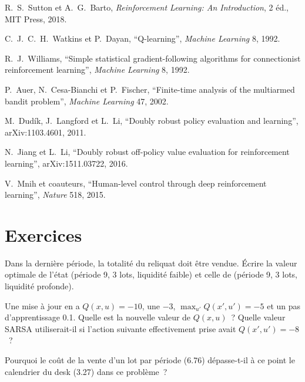\begin{omsources}
\item R.~S.~Sutton et A.~G.~Barto, \emph{Reinforcement Learning: An Introduction}, 2 éd., MIT Press, 2018.
\item C.~J.~C.~H.~Watkins et P.~Dayan, ``Q-learning'', \emph{Machine Learning} 8, 1992.
\item R.~J.~Williams, ``Simple statistical gradient-following algorithms for connectionist reinforcement learning'',
\emph{Machine Learning} 8, 1992.
\item P.~Auer, N.~Cesa-Bianchi et P.~Fischer, ``Finite-time analysis of the multiarmed bandit problem'', \emph{Machine
Learning} 47, 2002.
\item M.~Dudík, J.~Langford et L.~Li, ``Doubly robust policy evaluation and learning'', arXiv:1103.4601, 2011.
\item N.~Jiang et L.~Li, ``Doubly robust off-policy value evaluation for reinforcement learning'', arXiv:1511.03722, 2016.
\item V.~Mnih et coauteurs, ``Human-level control through deep reinforcement learning'', \emph{Nature} 518, 2015.
\end{omsources}

\section{Exercices}

\begin{exercise}[$\star$]\label{exo:ml:reinforcement-learning-foundations:1}
Dans la dernière période, la totalité du reliquat doit être vendue. Écrire la valeur optimale de l'état (période 9, 3 lots,
liquidité faible) et celle de (période 9, 3 lots, liquidité profonde).
\end{exercise}

\begin{exercise}[$\star$]\label{exo:ml:reinforcement-learning-foundations:2}
Une mise à jour en  a $Q(x, u) = -10$, une  $-3$, $\max_{u'}Q(x', u') = -5$ et un pas d'apprentissage 0.1. Quelle est la nouvelle valeur de $Q(x,
u)$~? Quelle valeur SARSA utiliserait-il si l'action suivante effectivement prise avait $Q(x', u') = -8$~?
\end{exercise}

\begin{exercise}[$\star$]\label{exo:ml:reinforcement-learning-foundations:3}
Pourquoi le coût de la vente d'un lot par période (6.76) dépasse-t-il à ce point le calendrier du desk (3.27) dans ce problème~?
\end{exercise}

